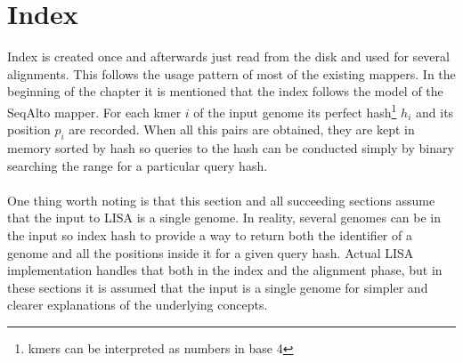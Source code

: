 \documentclass[times, utf8, diplomski]{fer}
\begin{document}
\section{Index}

Index is created once and afterwards just read from the disk and used for several alignments. This follows the usage pattern of most of the existing mappers. In the beginning of the chapter it is mentioned that the index follows the model of the SeqAlto mapper. For each kmer $i$ of the input genome its perfect hash\footnote{kmers can be interpreted as numbers in base 4} $h_i$ and its position $p_i$ are recorded. When all this pairs are obtained, they are kept in memory sorted by hash so queries to the hash can be conducted simply by binary searching the range for a particular query hash.\\
\\
One thing worth noting is that this section and all succeeding sections assume that the input to LISA is a single genome. In reality, several genomes can be in the input so index hash to provide a way to return both the identifier of a genome and all the positions inside it for a given query hash. Actual LISA implementation handles that both in the index and the alignment phase, but in these sections it is assumed that the input is a single genome for simpler and clearer explanations of the underlying concepts.

\begin{table}[H]
  \centering
  
  
  \caption{Conceptual diagram of an index}\label{indeks}
\end{table}
\end{document}
